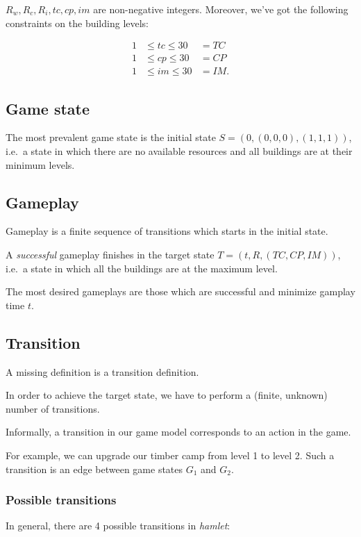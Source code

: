 \documentclass[12pt, a4paper, twocolumn]{article}
\newcommand{\hamlet}{\textit{hamlet}}
\begin{document}
\(R_w, R_c, R_i, tc, cp, im\) are non-negative integers.
Moreover, we've got the following constraints on the building levels:

\begin{equation*}
\begin{aligned}
  1 &\leq tc \leq 30 &= TC \\
  1 &\leq cp \leq 30 &= CP \\
  1 &\leq im \leq 30 &= IM.
\end{aligned}
\end{equation*}

\subsection{Game state}

The most prevalent game state is the initial state \(S = (0, (0, 0, 0), (1, 1, 1))\),
i.e.\ a state in which there are no available resources and all buildings are at their minimum levels.

\subsection{Gameplay}

Gameplay is a finite sequence of transitions which starts in the initial state.

A \textit{successful} gameplay finishes in the target state \(T = (t, R, (TC, CP, IM))\),
i.e.\ a state in which all the buildings are at the maximum level.

The most desired gameplays are those which are successful and minimize gamplay time \(t\).

\subsection{Transition}

A missing definition is a transition definition.

In order to achieve the target state, we have to perform a (finite, unknown) number of transitions.

Informally, a transition in our game model corresponds to an action in the game.

For example, we can upgrade our timber camp from level 1 to level 2.
Such a transition is an edge between game states \(G_1\) and \(G_2\).

\subsubsection{Possible transitions}
In general, there are 4 possible transitions in \hamlet:
\end{document}
